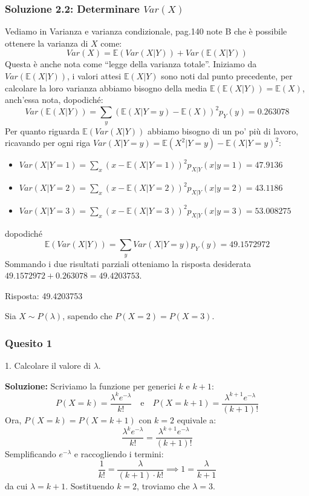 \documentclass[12pt, a4paper]{article}
\begin{document}
\subsubsection*{Soluzione 2.2: Determinare $Var(X)$}
Vediamo in Varianza e varianza condizionale, pag.140 note B che è possibile ottenere la varianza di $X$ come:
$$ Var(X) = \mathbb{E}(Var(X|Y)) + Var(\mathbb{E}(X|Y)) $$
Questa è anche nota come ``legge della varianza totale''. Iniziamo da $Var(\mathbb{E}(X|Y))$, i valori attesi $\mathbb{E}(X|Y)$ sono noti dal punto precedente, per calcolare la loro varianza abbiamo bisogno della media $\mathbb{E}(\mathbb{E}(X|Y)) = \mathbb{E}(X)$, anch’essa nota, dopodiché:
$$ Var(\mathbb{E}(X|Y)) = \sum_y (\mathbb{E}(X|Y=y) - \mathbb{E}(X))^2 p_Y(y) = 0.263078 $$
Per quanto riguarda $\mathbb{E}(Var(X|Y))$ abbiamo bisogno di un po’ più di lavoro, ricavando per ogni riga $Var(X|Y=y) = \mathbb{E}(X^2|Y=y) - \mathbb{E}(X|Y=y)^2$:
\begin{itemize}
    \item $Var(X|Y=1) = \sum_x (x - \mathbb{E}(X|Y=1))^2 p_{X|Y}(x|y=1) = 47.9136$
    \item $Var(X|Y=2) = \sum_x (x - \mathbb{E}(X|Y=2))^2 p_{X|Y}(x|y=2) = 43.1186$
    \item $Var(X|Y=3) = \sum_x (x - \mathbb{E}(X|Y=3))^2 p_{X|Y}(x|y=3) = 53.008275$
\end{itemize}
dopodiché 
$$ \mathbb{E}(Var(X|Y)) = \sum_y Var(X|Y=y)p_Y(y) = 49.1572972 $$
Sommando i due risultati parziali otteniamo la risposta desiderata $49.1572972 + 0.263078 = 49.4203753$.

Risposta: 49.4203753


\vspace{0.5cm}
\begin{tcolorbox}[colback=lightergray!10, colframe=tocsec, title=\textbf{Esercizio 10}]
Sia $X \sim P(\lambda)$, sapendo che $P(X=2) = P(X=3)$.
\end{tcolorbox}

\subsubsection*{Quesito 1}
1. Calcolare il valore di $\lambda$.

\textbf{Soluzione:}
Scriviamo la funzione per generici $k$ e $k+1$:
$$ P(X=k) = \frac{\lambda^k e^{-\lambda}}{k!} \quad \text{e} \quad P(X=k+1) = \frac{\lambda^{k+1} e^{-\lambda}}{(k+1)!} $$
Ora, $P(X=k)=P(X=k+1)$ con $k=2$ equivale a:
$$ \frac{\lambda^k e^{-\lambda}}{k!} = \frac{\lambda^{k+1} e^{-\lambda}}{(k+1)!} $$
Semplificando $e^{-\lambda}$ e raccogliendo i termini:
$$ \frac{1}{k!} = \frac{\lambda}{(k+1) \cdot k!} \implies 1 = \frac{\lambda}{k+1} $$
da cui $\lambda = k+1$. Sostituendo $k=2$, troviamo che $\lambda = 3$.
\end{document}
